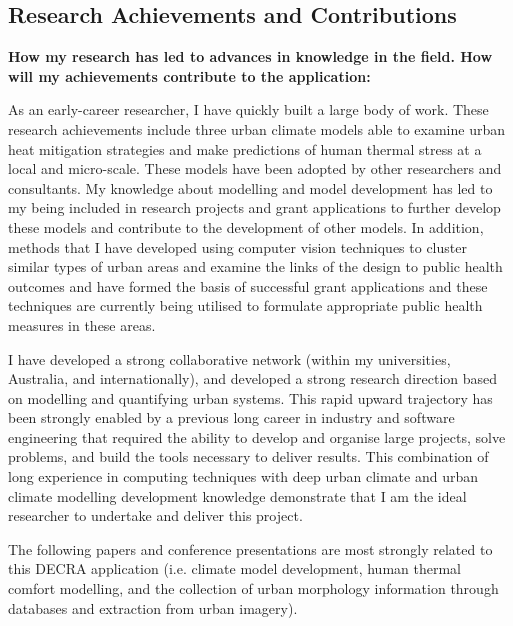 \subsection*{\TitleFont Research Achievements and Contributions}

\textbf{How my research has led to advances in knowledge in the field. How will my achievements contribute to the application:}


As an early-career researcher, I have quickly built a large body of work. These research achievements include three urban climate models able to examine urban heat mitigation strategies and make predictions of human thermal stress at a local and micro-scale. These models have been adopted by other researchers and consultants. My knowledge about modelling and model development has led to my being included in research projects and grant applications to further develop these models and contribute to the development of other models. In addition, methods that I have developed using computer vision techniques to cluster similar types of urban areas and examine the links of the design to public health outcomes and have formed the basis of successful grant applications and these techniques are currently being utilised to formulate appropriate public health measures in these areas. 


I have developed a strong collaborative network (within my universities, Australia, and internationally), and developed a strong research direction based on modelling and quantifying urban systems. This rapid upward trajectory has been strongly enabled by a previous long career in industry and software engineering that required the ability to develop and organise large projects, solve problems, and build the tools necessary to deliver results. This combination of long experience in computing techniques with deep urban climate and urban climate modelling development knowledge demonstrate that I am the ideal researcher to undertake and deliver this project.


The following papers and conference presentations are most strongly related to this DECRA application (i.e. climate model development, human thermal comfort modelling, and the collection of urban morphology information through databases and extraction from urban imagery).

